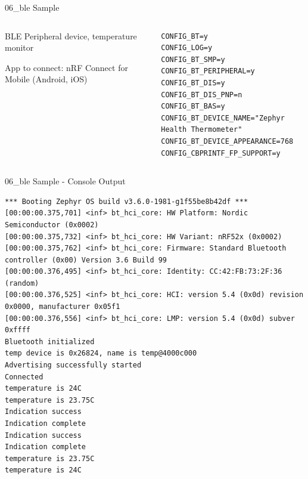 \documentclass[10pt, aspectratio=169]{beamer}
\begin{document}
\begin{frame}[fragile]{06\_ble Sample}
  \begin{columns}
    \begin{column}{0.6\textwidth}
      \begin{description}
     \item
	\item [Description] BLE Peripheral device, temperature monitor
	\item [Sample] App to connect: nRF Connect for Mobile (Android, iOS)
      \end{description}
    \end{column}
    \begin{column}{0.4\textwidth}
        {\fontsize{6}{6}\selectfont
  \begin{listing}[H]
    \begin{verbatim}
CONFIG_BT=y
CONFIG_LOG=y
CONFIG_BT_SMP=y
CONFIG_BT_PERIPHERAL=y
CONFIG_BT_DIS=y
CONFIG_BT_DIS_PNP=n
CONFIG_BT_BAS=y
CONFIG_BT_DEVICE_NAME="Zephyr Health Thermometer"
CONFIG_BT_DEVICE_APPEARANCE=768
CONFIG_CBPRINTF_FP_SUPPORT=y
    \end{verbatim}
    \caption{\scriptsize{Excerpt from samples/06\_ble/prj.conf}}
  \end{listing}
        }
    \end{column}
  \end{columns}
\end{frame}
\begin{frame}[fragile]{06\_ble Sample - Console Output}
  \begin{listing}[H]
    \begin{verbatim}
*** Booting Zephyr OS build v3.6.0-1981-g1f55be8b42df ***
[00:00:00.375,701] <inf> bt_hci_core: HW Platform: Nordic Semiconductor (0x0002)
[00:00:00.375,732] <inf> bt_hci_core: HW Variant: nRF52x (0x0002)
[00:00:00.375,762] <inf> bt_hci_core: Firmware: Standard Bluetooth controller (0x00) Version 3.6 Build 99
[00:00:00.376,495] <inf> bt_hci_core: Identity: CC:42:FB:73:2F:36 (random)
[00:00:00.376,525] <inf> bt_hci_core: HCI: version 5.4 (0x0d) revision 0x0000, manufacturer 0x05f1
[00:00:00.376,556] <inf> bt_hci_core: LMP: version 5.4 (0x0d) subver 0xffff
Bluetooth initialized
temp device is 0x26824, name is temp@4000c000
Advertising successfully started
Connected
temperature is 24C
temperature is 23.75C
Indication success
Indication complete
Indication success
Indication complete
temperature is 23.75C
temperature is 24C
    \end{verbatim}
  \end{listing}
\end{frame}
\end{document}
